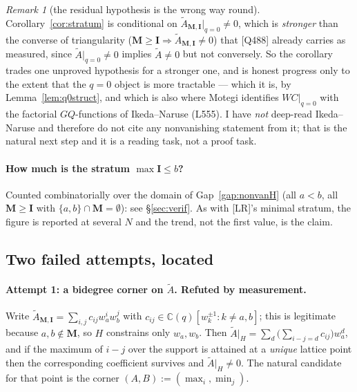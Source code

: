 \documentclass[11pt]{article}
\theoremstyle{plain}
\theoremstyle{definition}
\theoremstyle{remark}
\newtheorem{rem}[thm]{Remark}
\theoremstyle{plain}
\newcommand{\bI}{\mathbf{I}}
\newcommand{\bM}{\mathbf{M}}
\newcommand{\At}{\widetilde{A}}
\begin{document}
\begin{rem}[the residual hypothesis is the wrong way round]\label{rem:q0hyp}
Corollary~\ref{cor:stratum} is conditional on
$\At_{\bM,\bI}|_{q=0}\ne0$, which is \emph{stronger} than the converse of
triangularity ($\bM\ge\bI\Rightarrow\At_{\bM,\bI}\ne0$) that [Q488] already
carries as measured, since $\At|_{q=0}\ne0$ implies $\At\ne0$ but not
conversely.  So the corollary trades one unproved hypothesis for a stronger
one, and is honest progress only to the extent that the $q=0$ object is more
tractable --- which it is, by Lemma~\ref{lem:q0struct}, and which is also where
Motegi identifies $WC|_{q=0}$ with the factorial $GQ$-functions of
Ikeda--Naruse (L555).  I have \emph{not} deep-read Ikeda--Naruse and therefore do
not cite any nonvanishing statement from it; that is the natural next step and
it is a reading task, not a proof task.
\end{rem}

\paragraph{How much is the stratum $\max\bI\le b$?}
Counted combinatorially over the domain of Gap~\ref{gap:nonvanH} (all $a<b$, all
$\bM\ge\bI$ with $\{a,b\}\cap\bM=\emptyset$):
see \S\ref{sec:verif}.  As with [LR]'s minimal stratum, the figure is reported
at several $N$ and the trend, not the first value, is the claim.

\subsection{Two failed attempts, located}
\label{sec:failed}

\paragraph{Attempt 1: a bidegree corner on $\At$.  Refuted by measurement.}
Write $\At_{\bM,\bI}=\sum_{i,j}c_{ij}w_a^iw_b^j$ with
$c_{ij}\in\mathbb{C}(q)[w_k^{\pm1}:k\ne a,b]$; this is legitimate because
$a,b\notin\bM$, so $H$ constrains only $w_a,w_b$.  Then
$\At|_H=\sum_d\bigl(\sum_{i-j=d}c_{ij}\bigr)w_a^d$, and if the maximum of
$i-j$ over the support is attained at a \emph{unique} lattice point then the
corresponding coefficient survives and $\At|_H\ne0$.  The natural candidate for
that point is the corner $(A,B):=(\max_i,\min_j)$.
\end{document}
